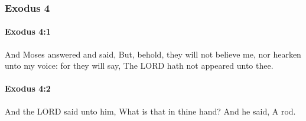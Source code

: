 	\subsubsection{Exodus 4} %
		\label{EXODUS-4}

		\paragraph{Exodus 4:1} %
			\label{EXODUS-4-1}

			And Moses answered and said, But, behold, they will not believe me, nor hearken unto my voice: for they will say, The LORD hath not appeared unto thee.


		\paragraph{Exodus 4:2} %
			\label{EXODUS-4-2}

			And the LORD said unto him, What is that in thine hand? And he said, A rod.

